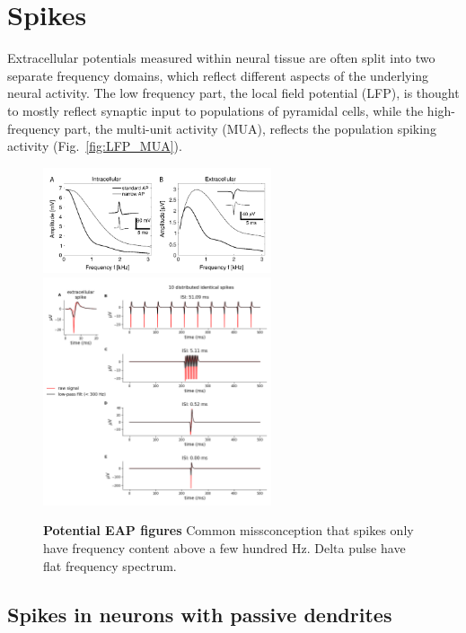 \section{Spikes}

Extracellular potentials measured within neural tissue are often split into two separate frequency domains, which reflect different aspects of the underlying neural activity. The low frequency part, the local field potential (LFP), is thought to mostly reflect synaptic input to populations of pyramidal cells, while the high-frequency part, the multi-unit activity (MUA), reflects the population spiking activity (Fig.~\ref{fig:LFP_MUA}).
\begin{figure}[!ht]
\begin{center}
\includegraphics[width=0.6\textwidth]{Figures/eap_illustration.png}
\includegraphics[width=0.6\textwidth]{Figures/LFP_spike_effect_test_300Hz.png}
\end{center}
\caption{\textbf{Potential EAP figures} 
Common missconception that spikes only have frequency content above a few hundred Hz. Delta pulse have flat frequency spectrum.}
\label{fig:freq_dep}
\end{figure}

\subsection{Spikes in neurons with passive dendrites} 
\label{spikes:sec:EP-spikes}
%


